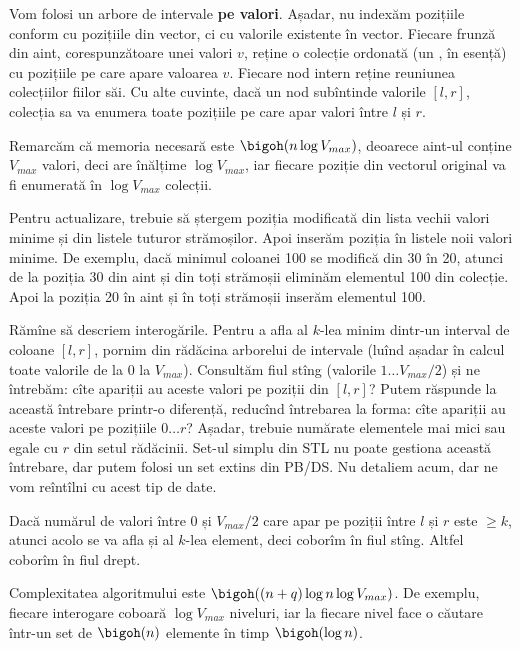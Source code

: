 Vom folosi un arbore de intervale \textbf{pe valori}. Așadar, nu indexăm pozițiile conform cu pozițiile din vector, ci cu valorile existente în vector. Fiecare frunză din aint, corespunzătoare unei valori $v$, reține o colecție ordonată (un , în esență) cu pozițiile pe care apare valoarea $v$. Fiecare nod intern reține reuniunea colecțiilor fiilor săi. Cu alte cuvinte, dacă un nod subîntinde valorile $[l, r]$, colecția sa va enumera toate pozițiile pe care apar valori între $l$ și $r$.

Remarcăm că memoria necesară este $\bigoh(n \log V_{max})$, deoarece aint-ul conține $V_{max}$ valori, deci are înălțime $\log V_{max}$, iar fiecare poziție din vectorul original va fi enumerată în $\log V_{max}$ colecții.

Pentru actualizare, trebuie să ștergem poziția modificată din lista vechii valori minime și din listele tuturor strămoșilor. Apoi inserăm poziția în listele noii valori minime. De exemplu, dacă minimul coloanei 100 se modifică din 30 în 20, atunci de la poziția 30 din aint și din toți strămoșii eliminăm elementul 100 din colecție. Apoi la poziția 20 în aint și în toți strămoșii inserăm elementul 100.

Rămîne să descriem interogările. Pentru a afla al $k$-lea minim dintr-un interval de coloane $[l, r]$, pornim din rădăcina arborelui de intervale (luînd așadar în calcul toate valorile de la 0 la $V_{max}$). Consultăm fiul stîng (valorile $1 \dots V_{max}/2$) și ne întrebăm: cîte apariții au aceste valori pe poziții din $[l, r]$? Putem răspunde la această întrebare printr-o diferență, reducînd întrebarea la forma: cîte apariții au aceste valori pe pozițiile $0 \dots r$? Așadar, trebuie numărate elementele mai mici sau egale cu $r$ din setul rădăcinii. Set-ul simplu din STL nu poate gestiona această întrebare, dar putem folosi un set extins din PB/DS. Nu detaliem acum, dar ne vom reîntîlni cu acest tip de date.

Dacă numărul de valori între 0 și $V_{max}/2$ care apar pe poziții între $l$ și $r$ este $\geq k$, atunci acolo se va afla și al $k$-lea element, deci coborîm în fiul stîng. Altfel coborîm în fiul drept.

Complexitatea algoritmului este $\bigoh((n + q) \log n \log V_{max})$. De exemplu, fiecare interogare coboară $\log V_{max}$ niveluri, iar la fiecare nivel face o căutare într-un set de $\bigoh(n)$ elemente în timp $\bigoh(\log n)$.
